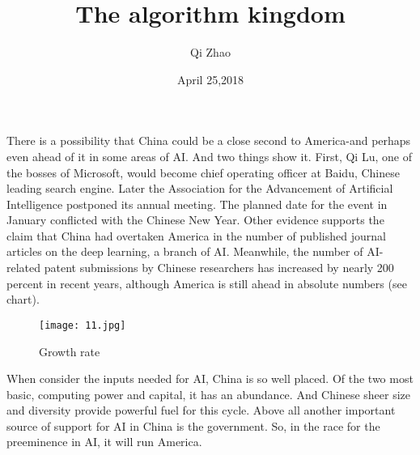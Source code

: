 \documentclass{article}
\author{Qi Zhao}
\date{April 25,2018}
\title{The algorithm kingdom}
\newcommand{\upcite}[1]{\textsuperscript{\textsuperscript{\cite{#1}}}}
\begin{document}
\maketitle
\par There is a possibility that China could be a close second to America-and perhaps even ahead of it in some areas of AI. And two things show it. First, Qi Lu, one of the bosses of Microsoft, would become chief operating officer at Baidu, Chinese leading search engine. Later the Association for the Advancement of Artificial Intelligence postponed its annual meeting. The planned date for the event in January conflicted with the Chinese New Year. Other evidence supports the claim that China had overtaken America in the number of published journal articles on the deep learning\upcite{Lecun2015Deep}, a branch of AI. Meanwhile, the number of AI-related patent submissions by Chinese researchers has increased by nearly 200 percent in recent years, although America is still ahead in absolute numbers (see chart).
\begin{figure}[htbp]
\centering
\texttt{[image: 11.jpg]}
\caption{Growth rate}
\label{1}
\end{figure}

\par When consider the inputs needed for AI, China is so well placed. Of the two most basic, computing power and capital, it has an abundance. And Chinese sheer size and diversity provide powerful fuel for this cycle. Above all another important source of support for AI in China is the government. So, in the race for the preeminence in AI, it will run America.
\section*{}


\end{document}
